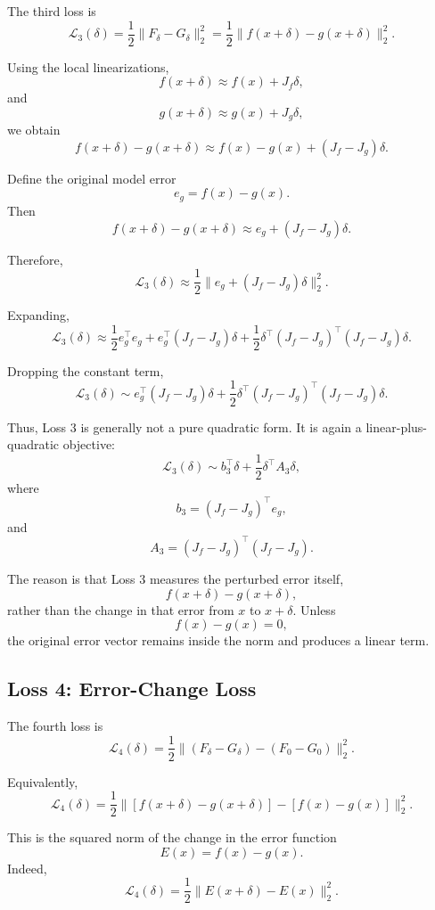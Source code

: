\documentclass{article}
\begin{document}
The third loss is
\[
    \mathcal L_3(\delta)
    =
    \frac{1}{2}\|F_\delta-G_\delta\|_2^2
    =
    \frac{1}{2}\|f(x+\delta)-g(x+\delta)\|_2^2.
\]

Using the local linearizations,
\[
    f(x+\delta)
    \approx
    f(x)+J_f\delta,
\]
and
\[
    g(x+\delta)
    \approx
    g(x)+J_g\delta,
\]
we obtain
\[
    f(x+\delta)-g(x+\delta)
    \approx
    f(x)-g(x)+(J_f-J_g)\delta.
\]

Define the original model error
\[
    e_g=f(x)-g(x).
\]
Then
\[
    f(x+\delta)-g(x+\delta)
    \approx
    e_g+(J_f-J_g)\delta.
\]

Therefore,
\[
    \mathcal L_3(\delta)
    \approx
    \frac{1}{2}\|e_g+(J_f-J_g)\delta\|_2^2.
\]

Expanding,
\[
    \mathcal L_3(\delta)
    \approx
    \frac{1}{2}e_g^\top e_g
    +
    e_g^\top (J_f-J_g)\delta
    +
    \frac{1}{2}
    \delta^\top
    (J_f-J_g)^\top(J_f-J_g)
    \delta.
\]

Dropping the constant term,
\[
    \mathcal L_3(\delta)
    \sim
    e_g^\top (J_f-J_g)\delta
    +
    \frac{1}{2}
    \delta^\top
    (J_f-J_g)^\top(J_f-J_g)
    \delta.
\]

Thus, Loss 3 is generally not a pure quadratic form. It is again a linear-plus-quadratic objective:
\[
    \mathcal L_3(\delta)
    \sim
    b_3^\top \delta
    +
    \frac{1}{2}\delta^\top A_3\delta,
\]
where
\[
    b_3=(J_f-J_g)^\top e_g,
\]
and
\[
    A_3=(J_f-J_g)^\top(J_f-J_g).
\]

The reason is that Loss 3 measures the perturbed error itself,
\[
    f(x+\delta)-g(x+\delta),
\]
rather than the change in that error from \(x\) to \(x+\delta\). Unless
\[
    f(x)-g(x)=0,
\]
the original error vector remains inside the norm and produces a linear term.

\subsection{Loss 4: Error-Change Loss}

The fourth loss is
\[
    \mathcal L_4(\delta)
    =
    \frac{1}{2}
    \|(F_\delta-G_\delta)-(F_0-G_0)\|_2^2.
\]

Equivalently,
\[
    \mathcal L_4(\delta)
    =
    \frac{1}{2}
    \|
    [f(x+\delta)-g(x+\delta)]
    -
    [f(x)-g(x)]
    \|_2^2.
\]

This is the squared norm of the change in the error function
\[
    E(x)=f(x)-g(x).
\]
Indeed,
\[
    \mathcal L_4(\delta)
    =
    \frac{1}{2}\|E(x+\delta)-E(x)\|_2^2.
\]
\end{document}
